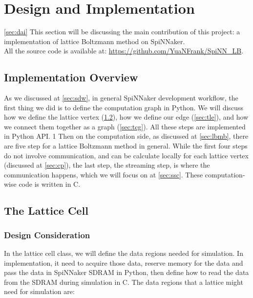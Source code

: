 

\newpage
\section{Design and Implementation} \ref{sec:dai}
This section will be discussing the main contribution of this project: a implementation of lattice Boltzmann method on SpiNNaker.  \\

All the source code is available at: \url{https://github.com/YuaNFrank/SpiNN_LB}.
\subsection{Implementation Overview}

As we discussed at \ref{sec:sdw}, in general SpiNNaker development workflow, the first thing we did is to define the computation graph in Python. We will discuss how we define the lattice vertex (\ref{sec:tlc}), how we define our edge (\ref{sec:tle}), and how we connect them together as a graph (\ref{sec:tcg}). All these steps are implemented in Python API.
1       
Then on the computation side, as discussed at \ref{sec:lbmb}, there are five step for a lattice Boltzmann method in general. While the first four steps do not involve communication, and can be calculate locally for each lattice vertex (discussed at \ref{sec:cp}), the last step, the streaming step, is where the communication happens, which we will focus on at \ref{sec:ssc}. These computation-wise code is written in C.

\subsection{The Lattice Cell} \label{sec:tlc}
\subsubsection{Design Consideration} \label{sec:tlcdc}
In the lattice cell class, we will define the data regions needed for simulation. In implementation, it need to acquire those data, reserve memory for the data and pass the data in SpiNNaker SDRAM in Python, then define how to read the data from the SDRAM during simulation in C. The data regions that a lattice might need for simulation are: \\

